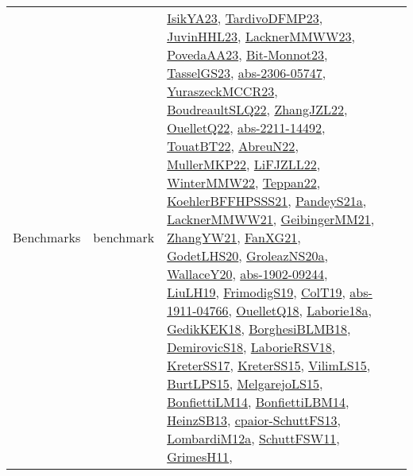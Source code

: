 {\begin{longtable}{lp{3cm}>{\raggedright}p{6cm}>{\raggedright}p{6cm}p{8cm}}
Benchmarks & benchmark & \href{articles/IsikYA23.pdf}{IsikYA23}\cite{IsikYA23}, \href{papers/TardivoDFMP23.pdf}{TardivoDFMP23}\cite{TardivoDFMP23}, \href{papers/JuvinHHL23.pdf}{JuvinHHL23}\cite{JuvinHHL23}, \href{articles/LacknerMMWW23.pdf}{LacknerMMWW23}\cite{LacknerMMWW23}, \href{papers/PovedaAA23.pdf}{PovedaAA23}\cite{PovedaAA23}, \href{papers/Bit-Monnot23.pdf}{Bit-Monnot23}\cite{Bit-Monnot23}, \href{papers/TasselGS23.pdf}{TasselGS23}\cite{TasselGS23}, \href{articles/abs-2306-05747.pdf}{abs-2306-05747}\cite{abs-2306-05747}, \href{articles/YuraszeckMCCR23.pdf}{YuraszeckMCCR23}\cite{YuraszeckMCCR23}, \href{papers/BoudreaultSLQ22.pdf}{BoudreaultSLQ22}\cite{BoudreaultSLQ22}, \href{papers/ZhangJZL22.pdf}{ZhangJZL22}\cite{ZhangJZL22}, \href{papers/OuelletQ22.pdf}{OuelletQ22}\cite{OuelletQ22}, \href{articles/abs-2211-14492.pdf}{abs-2211-14492}\cite{abs-2211-14492}, \href{papers/TouatBT22.pdf}{TouatBT22}\cite{TouatBT22}, \href{articles/AbreuN22.pdf}{AbreuN22}\cite{AbreuN22}, \href{articles/MullerMKP22.pdf}{MullerMKP22}\cite{MullerMKP22}, \href{papers/LiFJZLL22.pdf}{LiFJZLL22}\cite{LiFJZLL22}, \href{papers/WinterMMW22.pdf}{WinterMMW22}\cite{WinterMMW22}, \href{papers/Teppan22.pdf}{Teppan22}\cite{Teppan22}, \href{articles/KoehlerBFFHPSSS21.pdf}{KoehlerBFFHPSSS21}\cite{KoehlerBFFHPSSS21}, \href{articles/PandeyS21a.pdf}{PandeyS21a}\cite{PandeyS21a}, \href{papers/LacknerMMWW21.pdf}{LacknerMMWW21}\cite{LacknerMMWW21}, \href{papers/GeibingerMM21.pdf}{GeibingerMM21}\cite{GeibingerMM21}, \href{articles/ZhangYW21.pdf}{ZhangYW21}\cite{ZhangYW21}, \href{articles/FanXG21.pdf}{FanXG21}\cite{FanXG21}, \href{papers/GodetLHS20.pdf}{GodetLHS20}\cite{GodetLHS20}, \href{papers/GroleazNS20a.pdf}{GroleazNS20a}\cite{GroleazNS20a}, \href{articles/WallaceY20.pdf}{WallaceY20}\cite{WallaceY20}, \href{articles/abs-1902-09244.pdf}{abs-1902-09244}\cite{abs-1902-09244}, \href{papers/LiuLH19.pdf}{LiuLH19}\cite{LiuLH19}, \href{papers/FrimodigS19.pdf}{FrimodigS19}\cite{FrimodigS19}, \href{papers/ColT19.pdf}{ColT19}\cite{ColT19}, \href{articles/abs-1911-04766.pdf}{abs-1911-04766}\cite{abs-1911-04766}, \href{papers/OuelletQ18.pdf}{OuelletQ18}\cite{OuelletQ18}, \href{papers/Laborie18a.pdf}{Laborie18a}\cite{Laborie18a}, \href{articles/GedikKEK18.pdf}{GedikKEK18}\cite{GedikKEK18}, \href{articles/BorghesiBLMB18.pdf}{BorghesiBLMB18}\cite{BorghesiBLMB18}, \href{papers/DemirovicS18.pdf}{DemirovicS18}\cite{DemirovicS18}, \href{articles/LaborieRSV18.pdf}{LaborieRSV18}\cite{LaborieRSV18}, \href{articles/KreterSS17.pdf}{KreterSS17}\cite{KreterSS17}, \href{papers/KreterSS15.pdf}{KreterSS15}\cite{KreterSS15}, \href{papers/VilimLS15.pdf}{VilimLS15}\cite{VilimLS15}, \href{papers/BurtLPS15.pdf}{BurtLPS15}\cite{BurtLPS15}, \href{papers/MelgarejoLS15.pdf}{MelgarejoLS15}\cite{MelgarejoLS15}, \href{papers/BonfiettiLM14.pdf}{BonfiettiLM14}\cite{BonfiettiLM14}, \href{articles/BonfiettiLBM14.pdf}{BonfiettiLBM14}\cite{BonfiettiLBM14}, \href{articles/HeinzSB13.pdf}{HeinzSB13}\cite{HeinzSB13}, \href{papers/cpaior-SchuttFS13.pdf}{cpaior-SchuttFS13}\cite{cpaior-SchuttFS13}, \href{articles/LombardiM12a.pdf}{LombardiM12a}\cite{LombardiM12a}, \href{articles/SchuttFSW11.pdf}{SchuttFSW11}\cite{SchuttFSW11}, \href{papers/GrimesH11.pdf}{GrimesH11}\cite{GrimesH11}, 
\end{longtable}}
